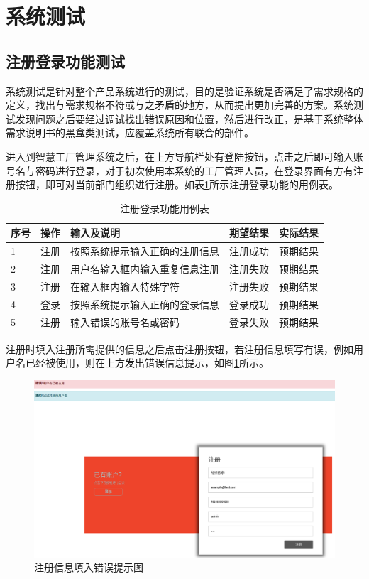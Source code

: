 \section{系统测试}

\subsection{注册登录功能测试}

系统测试是针对整个产品系统进行的测试，目的是验证系统是否满足了需求规格的定义，找出与需求规格不符或与之矛盾的地方，从而提出更加完善的方案。系统测试发现问题之后要经过调试找出错误原因和位置，然后进行改正，是基于系统整体需求说明书的黑盒类测试，应覆盖系统所有联合的部件。

进入到智慧工厂管理系统之后，在上方导航栏处有登陆按钮，点击之后即可输入账号名与密码进行登录，对于初次使用本系统的工厂管理人员，在登录界面有方有注册按钮，即可对当前部门组织进行注册。如表\ref{tab:rgstlgfuct}所示注册登录功能的用例表。

\begin{table}[H]
    \centering
    \caption{注册登录功能用例表}
    \label{tab:rgstlgfuct}
    \begin{tabularx}{.95\textwidth}{X<{\centering}X<{\centering}p{16em}<{\centering}X<{\centering}X<{\centering}}
        \toprule
        序号 & 操作 & 输入及说明 & 期望结果 & 实际结果 \\
        \midrule
        1 & 注册 & 按照系统提示输入正确的注册信息 & 注册成功 & 预期结果 \\
        2 & 注册 & 用户名输入框内输入重复信息注册 & 注册失败 & 预期结果 \\
        3 & 注册 & 在输入框内输入特殊字符 & 注册失败 & 预期结果 \\
        4 & 登录 & 按照系统提示输入正确的登录信息 & 登录成功 & 预期结果 \\
        5 & 注册 & 输入错误的账号名或密码 & 登录失败 & 预期结果 \\
        \bottomrule
    \end{tabularx}
\end{table}

注册时填入注册所需提供的信息之后点击注册按钮，若注册信息填写有误，例如用户名已经被使用，则在上方发出错误信息提示，如图\ref{fig:rgster}所示。

\begin{figure}[H]
    \centering
    \includegraphics[width=.75\textwidth]{figures/6registererror.png}
    \caption{注册信息填入错误提示图}
    \label{fig:rgster}
\end{figure}

